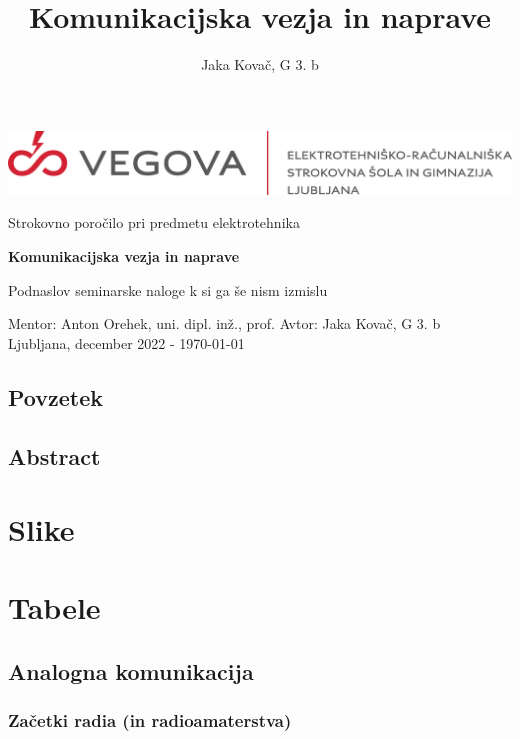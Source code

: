 \documentclass[12pt]{report}
\title{Komunikacijska vezja in naprave}
\author{Jaka Kovač, G 3. b}
\begin{document}

\begin{center}
    \thispagestyle{empty}
    \includegraphics[scale=1]{slike/logotip_vegova_leze_brezokvirja.png}
    
	\vspace{\fill} 
	Strokovno poročilo pri predmetu elektrotehnika

	\Huge{\textbf{Komunikacijska vezja in naprave}}

	\normalsize
	Podnaslov seminarske naloge k si ga še nism izmislu
    \vspace{\fill}

    Mentor: Anton Orehek, uni. dipl. inž., prof. \hfill Avtor: Jaka Kovač, G 3. b\\
    \null
	Ljubljana, december 2022 - \MMYYYYdate\today
\end{center}
\newpage
\null
\newpage

\section*{Povzetek}
\section*{Abstract}

\newpage
\tableofcontents

\begingroup
\makeatletter
\chapter*{Slike}
\let\clearpage\relax
\chapter*{Tabele}
\makeatother
\endgroup


\newpage
\section{Analogna komunikacija}
\subsection{Začetki radia (in radioamaterstva)}
\end{document}
